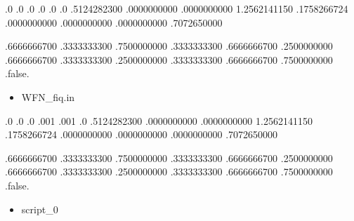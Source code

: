 \documentclass[a4paper,12pt,english]{sphinxmanual}
\begin{document}
\begin{sphinxVerbatim}[commandchars=\\\{\}]
          
.0  .0  .0
.0  .0  .0
      .5124282300       .0000000000       .0000000000
     \PYGZhy{}1.2562141150       .1758266724       .0000000000
      .0000000000       .0000000000       .7072650000

      .6666666700       .3333333300       .7500000000
      .3333333300       .6666666700       .2500000000
      .6666666700       .3333333300       .2500000000
      .3333333300       .6666666700       .7500000000
  
.false.
\end{sphinxVerbatim}
\begin{itemize}
\item {} 
\sphinxAtStartPar
WFN\_fiq.in

\end{itemize}

\begin{sphinxVerbatim}[commandchars=\\\{\}]
      
.0    .0    .0
.001  .001  .0 
      .5124282300       .0000000000       .0000000000
     \PYGZhy{}1.2562141150       .1758266724       .0000000000
      .0000000000       .0000000000       .7072650000

      .6666666700       .3333333300       .7500000000
      .3333333300       .6666666700       .2500000000
      .6666666700       .3333333300       .2500000000
      .3333333300       .6666666700       .7500000000
  
.false.
\end{sphinxVerbatim}
\begin{itemize}
\item {} 
\sphinxAtStartPar
script\_0

\end{itemize}
\end{document}
